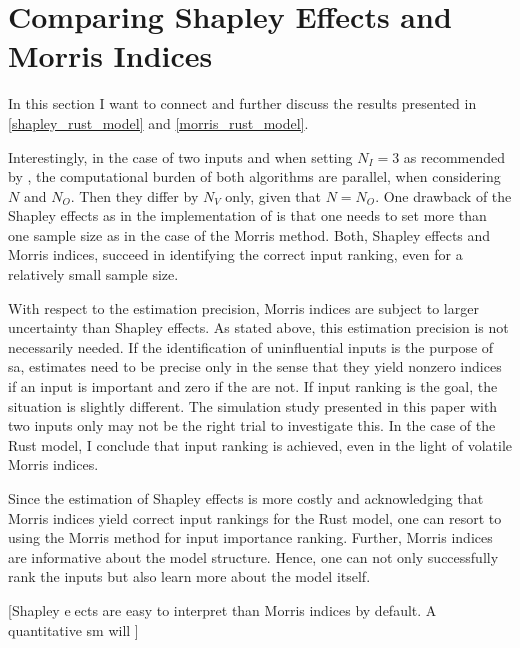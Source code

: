 \section{Comparing Shapley Effects and Morris Indices} \label{comparison}

In this section I want to connect and further discuss the results presented in \cref{shapley_rust_model}
and \cref{morris_rust_model}.

Interestingly, in the case of two inputs and when setting $N_I = 3$ as recommended
by \citet{SNS16}, the computational burden of both algorithms are parallel, when
considering $N$ and $N_O$. Then they differ by $N_V$ only, given that $N = N_O$. One drawback
of the Shapley effects as in the implementation of \citet{SNS16} is that one needs to
set more than one sample size as in the case of the Morris method.
Both, Shapley effects and Morris indices, succeed in identifying the correct input
ranking, even for a relatively small sample size.

With respect to the estimation precision, Morris indices are subject to larger uncertainty
than Shapley effects. As stated above, this estimation precision is not necessarily needed. If
the identification of uninfluential inputs is the purpose of sa, estimates need to be precise
only in the sense that they yield nonzero indices if an input is important and zero if the
are not. If input ranking is the goal, the situation is slightly different. The simulation
study presented in this paper with two inputs only may not be the right trial to investigate
this. In the case of the Rust model, I conclude that input ranking is achieved, even in the
light of volatile Morris indices.

Since the estimation of Shapley effects is more costly and acknowledging that Morris
indices yield correct input rankings for the Rust model, one can resort to using the Morris
method for input importance ranking. Further, Morris indices are informative about the
model structure. Hence, one can not only successfully rank the inputs but also learn more
about the model itself.

[Shapley eects are easy to interpret than Morris indices by default. A quantitative
sm will ]